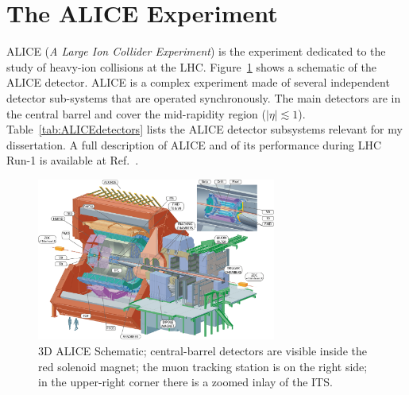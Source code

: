 \documentclass[12pt, a4paper, twoside, titlepage]{article}
\begin{document}
\section{The ALICE Experiment}
ALICE (\emph{A Large Ion Collider Experiment}) is the experiment dedicated to the study of heavy-ion collisions at the LHC.
Figure~\ref{fig:alice} shows a schematic of the ALICE detector.
ALICE is a complex experiment made of several independent detector sub-systems that are operated synchronously.
The main detectors are in the central barrel and cover the mid-rapidity region ($\lvert \eta\rvert \lesssim 1$).
Table~\ref{tab:ALICEdetectors} lists the ALICE detector subsystems
relevant for my dissertation.
A full description of ALICE and of its performance during LHC Run-1 is available at Ref.~\cite{ALICE:2014b}.\

\begin{figure}[tb]
\begin{center}
\includegraphics[width=0.7\textwidth]{img/alice}
 \caption{3D ALICE Schematic; central-barrel detectors are visible inside the red solenoid magnet;
 the muon tracking station is on the right side; in the upper-right corner there is a zoomed inlay of the ITS.} 
 \label{fig:alice}
\end{center}
\end{figure}
\end{document}
